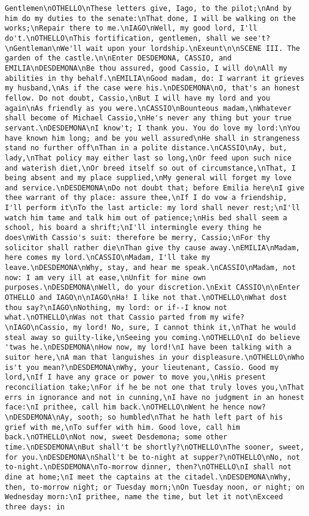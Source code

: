 \begin{verbatim}
Gentlemen\nOTHELLO\nThese letters give, Iago, to the pilot;\nAnd by him do my duties to the senate:\nThat done, I will be walking on the works;\nRepair there to me.\nIAGO\nWell, my good lord, I'll do't.\nOTHELLO\nThis fortification, gentlemen, shall we see't?\nGentleman\nWe'll wait upon your lordship.\nExeunt\n\nSCENE III. The garden of the castle.\n\nEnter DESDEMONA, CASSIO, and EMILIA\nDESDEMONA\nBe thou assured, good Cassio, I will do\nAll my abilities in thy behalf.\nEMILIA\nGood madam, do: I warrant it grieves my husband,\nAs if the case were his.\nDESDEMONA\nO, that's an honest fellow. Do not doubt, Cassio,\nBut I will have my lord and you again\nAs friendly as you were.\nCASSIO\nBounteous madam,\nWhatever shall become of Michael Cassio,\nHe's never any thing but your true servant.\nDESDEMONA\nI know't; I thank you. You do love my lord:\nYou have known him long; and be you well assured\nHe shall in strangeness stand no further off\nThan in a polite distance.\nCASSIO\nAy, but, lady,\nThat policy may either last so long,\nOr feed upon such nice and waterish diet,\nOr breed itself so out of circumstance,\nThat, I being absent and my place supplied,\nMy general will forget my love and service.\nDESDEMONA\nDo not doubt that; before Emilia here\nI give thee warrant of thy place: assure thee,\nIf I do vow a friendship, I'll perform it\nTo the last article: my lord shall never rest;\nI'll watch him tame and talk him out of patience;\nHis bed shall seem a school, his board a shrift;\nI'll intermingle every thing he does\nWith Cassio's suit: therefore be merry, Cassio;\nFor thy solicitor shall rather die\nThan give thy cause away.\nEMILIA\nMadam, here comes my lord.\nCASSIO\nMadam, I'll take my leave.\nDESDEMONA\nWhy, stay, and hear me speak.\nCASSIO\nMadam, not now: I am very ill at ease,\nUnfit for mine own purposes.\nDESDEMONA\nWell, do your discretion.\nExit CASSIO\n\nEnter OTHELLO and IAGO\n\nIAGO\nHa! I like not that.\nOTHELLO\nWhat dost thou say?\nIAGO\nNothing, my lord: or if--I know not what.\nOTHELLO\nWas not that Cassio parted from my wife?\nIAGO\nCassio, my lord! No, sure, I cannot think it,\nThat he would steal away so guilty-like,\nSeeing you coming.\nOTHELLO\nI do believe 'twas he.\nDESDEMONA\nHow now, my lord!\nI have been talking with a suitor here,\nA man that languishes in your displeasure.\nOTHELLO\nWho is't you mean?\nDESDEMONA\nWhy, your lieutenant, Cassio. Good my lord,\nIf I have any grace or power to move you,\nHis present reconciliation take;\nFor if he be not one that truly loves you,\nThat errs in ignorance and not in cunning,\nI have no judgment in an honest face:\nI prithee, call him back.\nOTHELLO\nWent he hence now?\nDESDEMONA\nAy, sooth; so humbled\nThat he hath left part of his grief with me,\nTo suffer with him. Good love, call him back.\nOTHELLO\nNot now, sweet Desdemona; some other time.\nDESDEMONA\nBut shall't be shortly?\nOTHELLO\nThe sooner, sweet, for you.\nDESDEMONA\nShall't be to-night at supper?\nOTHELLO\nNo, not to-night.\nDESDEMONA\nTo-morrow dinner, then?\nOTHELLO\nI shall not dine at home;\nI meet the captains at the citadel.\nDESDEMONA\nWhy, then, to-morrow night; or Tuesday morn;\nOn Tuesday noon, or night; on Wednesday morn:\nI prithee, name the time, but let it not\nExceed three days: in 
\end{verbatim}
